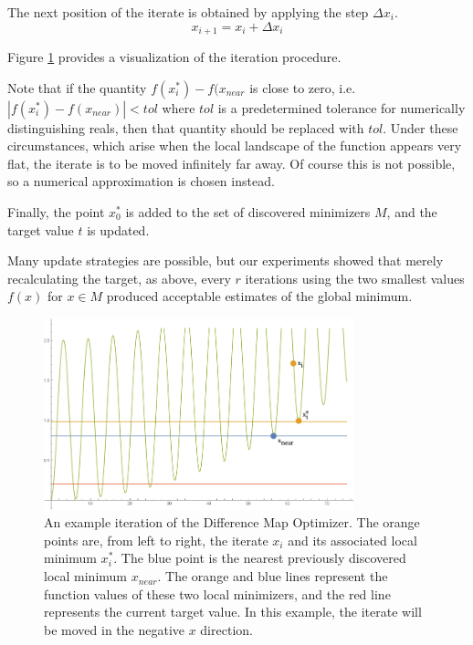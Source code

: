 \documentclass[12pt]{article}
\begin{document}
The next position of the iterate is obtained by applying the step
$\Delta x_i$.
$$
    x_{i+1} = x_i + \Delta x_i
$$

Figure \ref{fig:iteration} provides a visualization of the iteration
procedure.

Note that if the quantity $f(x_i^*) - f(x_{near}$ is close to zero, i.e.
$|f(x_i^*) - f(x_{near})| < tol$ where $tol$ is a predetermined tolerance
for numerically distinguishing reals, then that quantity should be
replaced with $tol$.
Under these circumstances, which arise when the local landscape of the
function appears very flat, the iterate is to be moved infinitely far away.
Of course this is not possible, so a numerical approximation is chosen
instead.

Finally, the point $x_0^*$ is added to the set of discovered minimizers
$M$, and the target value $t$ is updated.

Many update strategies are possible, but our experiments showed that merely
recalculating the target, as above, every $r$ iterations using the two
smallest values $f(x)$ for $x \in M$ produced acceptable estimates of the
global minimum.

\begin{figure}[H]
    \begin{center}
        \includegraphics[width=0.8\textwidth]{../figures/iteratingnew.png}
        \caption{An example iteration of the Difference Map Optimizer.
            The orange points are, from left to right, the iterate $x_i$
            and its associated local minimum $x_i^*$. The blue point is the
            nearest previously discovered local minimum $x_{near}$.
            The orange and blue lines represent the function values of
            these two local minimizers, and the red line represents the
            current target value. In this example, the iterate will be
            moved in the negative $x$ direction.}
        \label{fig:iteration}
    \end{center}
\end{figure}
\end{document}
